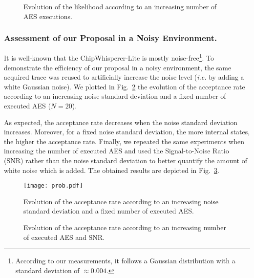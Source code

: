 \begin{figure}[ht!]
\caption{Evolution of the likelihood according to an increasing number of AES executions.}\label{fig:likely_grow}
\end{figure}

\subsubsection{Assessment of our Proposal in a Noisy Environment.}
It is well-known that the ChipWhisperer-Lite is mostly noise-free\footnote{According to our measurements, it follows a Gaussian distribution with a standard deviation of $\approx 0.004$.}. To demonstrate the efficiency of our proposal in a noisy environment, the same acquired trace was reused to artificially increase the noise level (\emph{i.e.} by adding a white Gaussian noise).
We plotted in Fig.~\ref{fig:FRRwh} the evolution of the acceptance rate according to an increasing noise standard deviation and a fixed number of executed AES ($N=20$).

As expected, the acceptance rate decreases when the noise standard deviation increases. Moreover, for a fixed noise standard deviation, the more internal states, the higher the acceptance rate.
Finally, we repeated the same experiments when increasing the number of executed AES and  used the Signal-to-Noise Ratio (SNR) rather than the noise standard deviation to better quantify the amount of white noise which is added. The obtained results are depicted in Fig.~\ref{fig:fixed_noised}.

\begin{figure}[ht!]
\centering
\texttt{[image: prob.pdf]}
\caption{Evolution of the acceptance rate according to an increasing noise standard deviation and a fixed number of executed AES.}\label{fig:FRRwh}
\end{figure}

\begin{figure}[ht!]
\centering
\caption{Evolution of the acceptance rate according to an increasing number of executed AES and SNR.}\label{fig:fixed_noised}
\end{figure}
	
